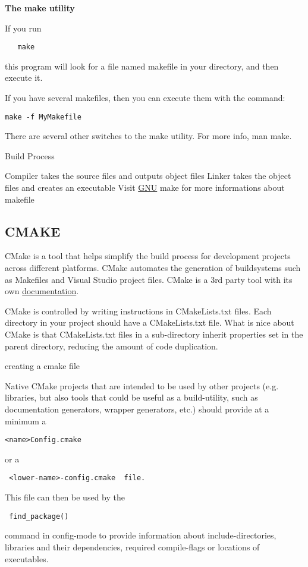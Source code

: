 \documentclass[11pt,utf8]{article}
\begin{document}
\textbf{The make utility}

If you run
\begin{lstlisting}
   make
  \end{lstlisting}
this program will look for a file named makefile in your directory, and then execute it.

If you have several makefiles, then you can execute them with the command:
\begin{lstlisting}
make -f MyMakefile
\end{lstlisting}

There are several other switches to the make utility. For more info, man make.

Build Process

Compiler takes the source files and outputs object files
Linker takes the object files and creates an executable
Visit \href{http://www.gnu.org/software/make/manual/make.html}{GNU} make for more informations about makefile

\subsection{CMAKE}

CMake is a tool that helps simplify the build process for development projects across different platforms. CMake automates the generation of buildsystems such as Makefiles and Visual Studio project files. CMake is a 3rd party tool with its own \href{http://www.cmake.org/documentation/}{documentation}.

CMake is controlled by writing instructions in CMakeLists.txt files. Each directory in your project should have a CMakeLists.txt file. What is nice about CMake is that CMakeLists.txt files in a sub-directory inherit properties set in the parent directory, reducing the amount of code duplication.

creating a cmake file

Native CMake projects that are intended to be used by other projects (e.g. libraries, but also tools that could be useful as a build-utility, such as documentation generators, wrapper generators, etc.) should provide at a minimum a 
\begin{lstlisting}
<name>Config.cmake 
\end{lstlisting}
or a
\begin{lstlisting}
 <lower-name>-config.cmake  file.
 \end{lstlisting}
This file can then be used by the
 \begin{lstlisting}
 find_package() 
 \end{lstlisting}
 command in config-mode to provide information about include-directories, libraries and their dependencies, required compile-flags or locations of executables.
\end{document}
